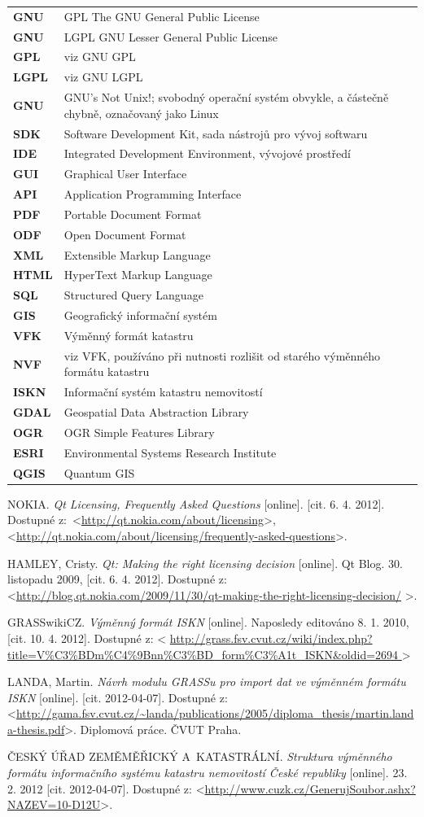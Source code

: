 \documentclass[a4paper,12pt]{article}
\newcommand{\radekZkr}[2]{\textbf{#1} & #2 \\}
\begin{document}
\newpage
\begin{tabular}{lp{10cm}}

\radekZkr{GNU}{GPL The GNU General Public License}
\radekZkr{GNU}{LGPL GNU Lesser General Public License}
\radekZkr{GPL}{viz GNU GPL}
\radekZkr{LGPL}{viz GNU LGPL}
\radekZkr{GNU}{GNU's Not Unix!; svobodný operační systém obvykle, a částečně chybně, označovaný jako Linux}

\radekZkr{SDK}{Software Development Kit, sada nástrojů pro vývoj softwaru}
\radekZkr{IDE}{Integrated Development Environment, vývojové prostředí}
\radekZkr{GUI}{Graphical User Interface}
\radekZkr{API}{Application Programming Interface}

\radekZkr{PDF}{Portable Document Format}
\radekZkr{ODF}{Open Document Format}
\radekZkr{XML}{Extensible Markup Language}
\radekZkr{HTML}{HyperText Markup Language}
\radekZkr{SQL}{Structured Query Language}

\radekZkr{GIS}{Geografický informační systém}

\radekZkr{VFK}{Výměnný formát katastru}
\radekZkr{NVF}{viz VFK, používáno při nutnosti rozlišit od starého výměnného formátu katastru}
\radekZkr{ISKN}{Informační systém katastru nemovitostí}

\radekZkr{GDAL}{Geospatial Data Abstraction Library}
\radekZkr{OGR}{OGR Simple Features Library}
\radekZkr{ESRI}{Environmental Systems Research Institute}
\radekZkr{QGIS}{Quantum GIS}

\end{tabular}

\begin{thebibliography}{9}

NOKIA. \textit{Qt Licensing, Frequently Asked Questions} [online]. [cit. 6. 4. 2012].
Dostupné z:~\textless\url{http://qt.nokia.com/about/licensing}\textgreater, \textless\url{http://qt.nokia.com/about/licensing/frequently-asked-questions}\textgreater.

HAMLEY, Cristy. \textit{Qt: Making the right licensing decision} [online]. Qt Blog. 30. listopadu 2009, [cit. 6. 4. 2012]. Dostupné z: \textless\url{http://blog.qt.nokia.com/2009/11/30/qt-making-the-right-licensing-decision/} \textgreater.

GRASSwikiCZ. \textit{Výměnný formát ISKN} [online].
Naposledy editováno 8. 1. 2010, [cit. 10. 4. 2012]. Dostupné z: \textless
\url{
    http://grass.fsv.cvut.cz/wiki/index.php?title=V%
    } \textgreater

LANDA, Martin. \emph{Návrh modulu GRASSu pro import dat ve výměnném formátu ISKN} [online]. [cit. 2012-04-07]. Dostupné z: \textless\url{http://gama.fsv.cvut.cz/~landa/publications/2005/diploma_thesis/martin.landa-thesis.pdf}\textgreater. Diplomová práce. ČVUT Praha.

ČESKÝ ÚŘAD ZEMĚMĚŘICKÝ A~KATASTRÁLNÍ. \emph{Struktura výměnného formátu informačního systému katastru nemovitostí České republiky} [online]. 23. 2. 2012 [cit. 2012-04-07]. Dostupné z: \textless\url{http://www.cuzk.cz/GenerujSoubor.ashx?NAZEV=10-D12U}\textgreater.
    
    \end{thebibliography}
\end{document}
